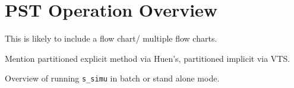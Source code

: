 \chapter{PST Operation Overview}

This is likely to include a flow chart/ multiple flow charts.

Mention partitioned explicit method via Huen's, partitioned implicit via VTS.

Overview of running \verb|s_simu| in batch or stand alone mode.